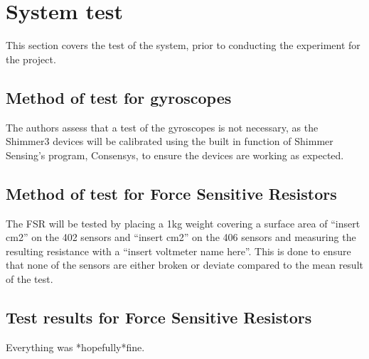 \section{System test}
This section covers the test of the system, prior to conducting the experiment for the project. 

\subsection{Method of test for gyroscopes}
The authors assess that a test of the gyroscopes is not necessary, as the Shimmer3 devices will be calibrated using the built in function of Shimmer Sensing’s program, Consensys, to ensure the devices are working as expected.



\subsection{Method of test for Force Sensitive Resistors}
The FSR will be tested by placing a 1kg weight covering a surface area of “insert cm2” on the 402 sensors and “insert cm2” on the 406 sensors and measuring the resulting resistance with a “insert voltmeter name here”. This is done to ensure that none of the sensors are either broken or deviate compared to the mean result of the test. 


\subsection{Test  results for Force Sensitive Resistors}

Everything was *hopefully*fine. 



